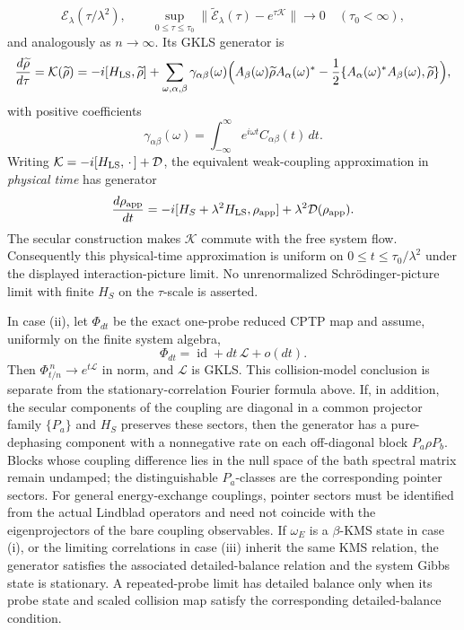 \documentclass[12pt,a4paper]{article}
\begin{document}
\begin{theorem}
\[                  \mathcal E_\lambda(\tau/\lambda^2),
 \qquad
 \sup_{0\le\tau\le\tau_0}
 \|\widetilde{\mathcal E}_\lambda(\tau)-e^{\tau\mathcal K}\|
 \longrightarrow0
 \quad(\tau_0<\infty),
\]
and analogously as \(n\to\infty\).  Its GKLS generator is
\[
\frac{d\widetilde\rho}{d\tau}=\mathcal K(\widetilde\rho)
=
-i[H_{\mathrm{LS}},\widetilde\rho]
+
\sum_{\omega,\alpha,\beta}
\gamma_{\alpha\beta}(\omega)
\Bigl(
A_\beta(\omega)\widetilde\rho A_\alpha(\omega)^*
-\frac12\{A_\alpha(\omega)^*A_\beta(\omega),\widetilde\rho\}
\Bigr),
\]
with positive coefficients
\[
\gamma_{\alpha\beta}(\omega)
=
\int_{-\infty}^{\infty} e^{i\omega t}C_{\alpha\beta}(t)\,dt.
\]
Writing \(\mathcal K=-i[H_{\rm LS},\,\cdot\,]+\mathcal D\), the equivalent
weak-coupling approximation in \emph{physical time} has generator
\[
 \frac{d\rho_{\rm app}}{dt}
 =-i[H_S+\lambda^2H_{\rm LS},\rho_{\rm app}]
                         +\lambda^2\mathcal D(\rho_{\rm app}).
\]
The secular construction makes \(\mathcal K\) commute with the free
system flow.  Consequently this physical-time approximation is uniform
on \(0\le t\le\tau_0/\lambda^2\) under the displayed interaction-picture
limit.  No unrenormalized Schr\"odinger-picture limit with finite
\(H_S\) on the \(\tau\)-scale is asserted.

In case (ii), let \(\Phi_{dt}\) be the exact one-probe reduced CPTP map and
assume, uniformly on the finite system algebra,
\[
\Phi_{dt}
=\operatorname{id}+dt\,\mathcal L+o(dt).
\]
Then \(\Phi_{t/n}^{\,n}\to e^{t\mathcal L}\) in norm, and
\(\mathcal L\) is GKLS.  This collision-model conclusion is separate from
the stationary-correlation Fourier formula above.
If, in addition, the secular components of the coupling are diagonal in a
common projector family \(\{P_a\}\) and \(H_S\) preserves these sectors, then
the generator has a pure-dephasing component with a nonnegative rate on each
off-diagonal block \(P_a\rho P_b\).  Blocks whose coupling difference lies
in the null space of the bath spectral matrix remain undamped; the
distinguishable \(P_a\)-classes are the corresponding pointer sectors.  For
general energy-exchange couplings, pointer sectors must be
identified from the actual Lindblad operators and need not coincide with the
eigenprojectors of the bare coupling observables.  If \(\omega_E\) is a
\(\beta\)-KMS state in case (i), or the limiting correlations in case (iii)
inherit the same KMS relation, the generator satisfies the associated
detailed-balance relation and the system Gibbs state is stationary.  A
repeated-probe limit has detailed balance only when its probe state and
scaled collision map satisfy the corresponding detailed-balance condition.


\end{theorem}
\end{document}
